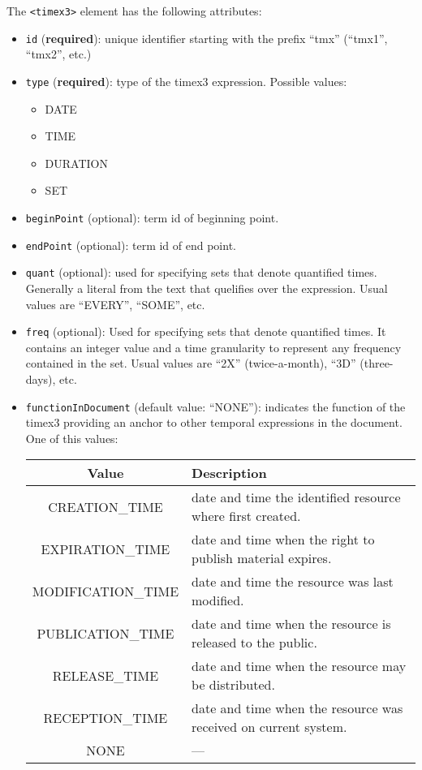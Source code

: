 The \texttt{<timex3>} element has the following attributes:
\begin{itemize}
\item \texttt{id} (\textbf{required}): unique identifier starting with
  the prefix ``tmx'' (``tmx1'', ``tmx2'', etc.)

\item \texttt{type} (\textbf{required}): type of the timex3
  expression. Possible values:
  \begin{itemize}
  \item DATE
  \item TIME
  \item DURATION
  \item SET
  \end{itemize}

\item \texttt{beginPoint} (optional): term id of beginning point.
\item \texttt{endPoint} (optional): term id of end point.
\item \texttt{quant} (optional): used for specifying sets that denote
  quantified times. Generally a literal from the text that quelifies over
  the expression. Usual values are ``EVERY'', ``SOME'', etc.
\item \texttt{freq} (optional): Used for specifying sets that denote
  quantified times. It contains an integer value and a time granularity to
  represent any frequency contained in the set. Usual values are ``2X''
  (twice-a-month), ``3D'' (three-days), etc.

\item \texttt{functionInDocument} (default value: ``NONE''): indicates the
  function of the timex3 providing an anchor to other temporal expressions
  in the document. One of this values:

  \begin{tabular}{|c|p{9cm}|}
    \hline
    Value & Description \\
    \hline
    CREATION\_TIME     & date and time the identified resource where first created.\\
    EXPIRATION\_TIME   & date and time when the right to publish material expires.\\
    MODIFICATION\_TIME & date and time the resource was last modified.\\
    PUBLICATION\_TIME  & date and time when the resource is released to the public.\\
    RELEASE\_TIME      & date and time when the resource may be distributed.\\
    RECEPTION\_TIME    & date and time when the resource was received on current system.\\
    NONE & ---\\
    \hline


\end{tabular}
\end{itemize}
